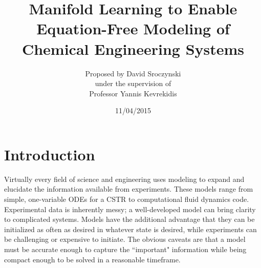 \documentclass[12pt]{article}
\begin{document}
\title{Manifold Learning to Enable Equation-Free Modeling of Chemical Engineering Systems}
\author{\LARGE Proposed by David Sroczynski\vspace{3mm}\\\Large under the supervision of\vspace{3mm}\\\LARGE Professor Yannis Kevrekidis}
\date{11/04/2015}
\maketitle
\thispagestyle{empty}
\clearpage
\tableofcontents
\thispagestyle{empty}
\clearpage
{}
\section{Introduction}
Virtually every field of science and engineering uses modeling to expand and elucidate the information available from experiments. These models range from simple, one-variable ODEs for a CSTR to computational fluid dynamics code. Experimental data is inherently messy; a well-developed model can bring clarity to complicated systems. Models have the additional advantage that they can be initialized as often as desired in whatever state is desired, while experiments can be challenging or expensive to initiate. The obvious caveats are that a model must be accurate enough to capture the ``important" information while being compact enough to be solved in a reasonable timeframe.  \vspace{1mm}
\end{document}
